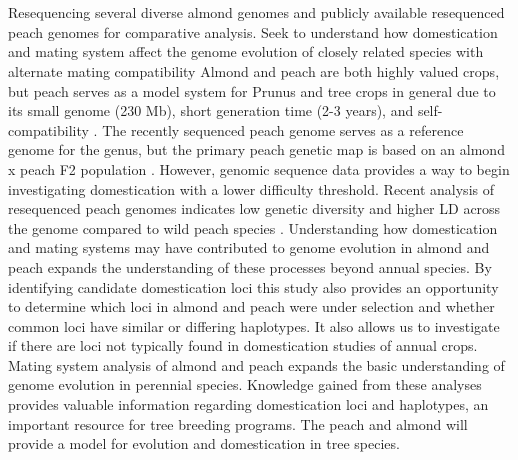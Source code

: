 \documentclass[12pt]{article}
\begin{document}
%
\\
\\
Resequencing several diverse almond genomes and publicly available resequenced peach genomes for comparative analysis. 
%
Seek to understand how domestication and mating system affect the genome evolution of closely related species with alternate mating compatibility
%
Almond and peach are both highly valued crops, but peach serves as a model system for Prunus and tree crops in general due to its small genome (230 Mb), short generation time (2-3 years), and self-compatibility \citep{arus2012peach}.
%
The recently sequenced peach genome \citep{verde2013high}serves as a reference genome for the genus, but the primary peach genetic map is based on an almond x peach F2 population \citep{arus2012peach, joobeur1998construction, aranzana2003set, dirlewanger2004comparative, dominguez2003plant}.
%
However, genomic sequence data provides a way to begin investigating domestication with a lower difficulty threshold.
%
Recent analysis of resequenced peach genomes indicates low genetic diversity and higher LD across the genome
compared to wild peach species \citep{verde2013high}. 
%
%
Understanding how domestication and mating systems may have contributed to genome evolution in almond and peach expands the understanding of these processes beyond annual species. 
%
By identifying candidate domestication loci this study also provides an opportunity to determine which loci in almond and peach were under selection and whether common loci have similar or differing haplotypes. 
%
It also allows us to investigate if there are loci not typically found in domestication studies of annual crops. 
%
Mating system analysis of almond and peach expands the basic understanding of genome evolution in perennial species. 
%
Knowledge gained from these analyses provides valuable information regarding domestication loci and haplotypes, an
important resource for tree breeding programs.
%
The peach and almond will provide a model for evolution and domestication in tree species.
\\
\\

\end{document}
